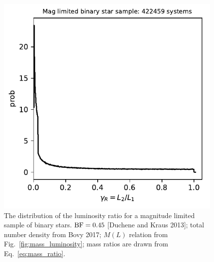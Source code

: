\documentclass{emulateapj}
\begin{document}
\begin{figure}[!t]
	\begin{center}
		\includegraphics[scale=.8]{figures/gammaR_distribn_mag_limited.pdf}
	\end{center}
	\caption{The distribution of the luminosity ratio for a magnitude limited 
		sample of binary stars. ${\rm BF} = 0.45$ [Duchene and Kraus 2013]; 
		total 
		number density from Bovy 2017; $M(L)$ relation from 
		Fig.~\ref{fig:mass_luminosity}; mass ratios are drawn from 
		Eq.~\ref{eq:mass_ratio}.}
	\label{fig:gammaR_distribn_mag_limited}
\end{figure}
\end{document}
